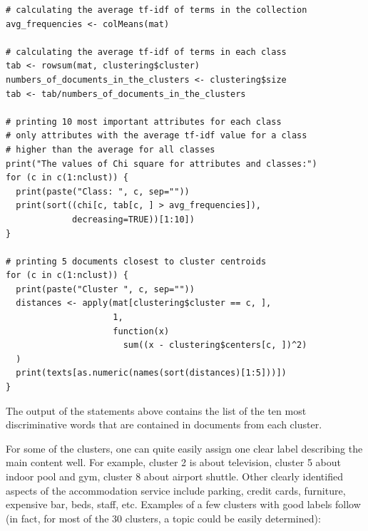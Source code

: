 \documentclass[11pt,openany,executivepaper]{book}
\begin{document}
\begin{verbatim}
# calculating the average tf-idf of terms in the collection
avg_frequencies <- colMeans(mat)

# calculating the average tf-idf of terms in each class
tab <- rowsum(mat, clustering$cluster)
numbers_of_documents_in_the_clusters <- clustering$size
tab <- tab/numbers_of_documents_in_the_clusters

# printing 10 most important attributes for each class
# only attributes with the average tf-idf value for a class
# higher than the average for all classes
print("The values of Chi square for attributes and classes:")
for (c in c(1:nclust)) {
  print(paste("Class: ", c, sep=""))
  print(sort((chi[c, tab[c, ] > avg_frequencies]),
             decreasing=TRUE))[1:10])
}

# printing 5 documents closest to cluster centroids
for (c in c(1:nclust)) {
  print(paste("Cluster ", c, sep=""))
  distances <- apply(mat[clustering$cluster == c, ],
                     1,
                     function(x)
                       sum((x - clustering$centers[c, ])^2)
  )
  print(texts[as.numeric(names(sort(distances)[1:5]))])
}
\end{verbatim}

The output of the statements above contains the list of the ten most discriminative words that are contained in documents from each cluster.

For some of the clusters, one can quite easily assign one clear label describing the main content well. For example, cluster 2 is about television, cluster 5 about indoor pool and gym, cluster 8 about airport shuttle. Other clearly identified aspects of the accommodation service include parking, credit cards, furniture, expensive bar, beds, staff, etc. Examples of a few clusters with good labels follow
(in fact, for most of the 30 clusters, a topic could be easily determined):
\end{document}
